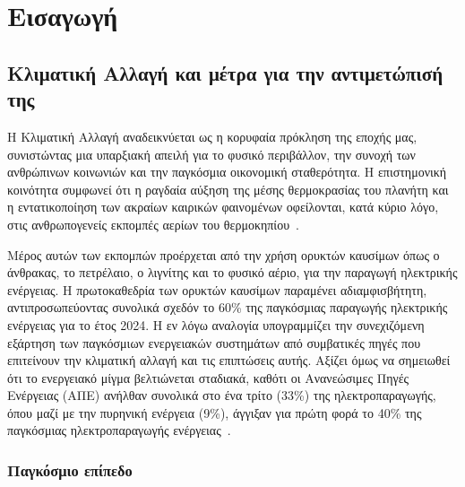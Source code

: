 % 

\chapter{Εισαγωγή}
\label{ch:introduction}

\section{Κλιματική Αλλαγή και μέτρα για την αντιμετώπισή της}
\label{sec:climate-change}

Η Κλιματική Αλλαγή αναδεικνύεται ως η κορυφαία πρόκληση της εποχής μας, συνιστώντας μια υπαρξιακή απειλή για το φυσικό περιβάλλον, την συνοχή των ανθρώπινων κοινωνιών και την παγκόσμια οικονομική σταθερότητα. Η επιστημονική κοινότητα συμφωνεί ότι η ραγδαία αύξηση της μέσης θερμοκρασίας του πλανήτη και η εντατικοποίηση των ακραίων καιρικών φαινομένων οφείλονται, κατά κύριο λόγο, στις ανθρωπογενείς εκπομπές αερίων του θερμοκηπίου~\cite{lynas2021}.

Μέρος αυτών των εκπομπών προέρχεται από την χρήση ορυκτών καυσίμων όπως ο άνθρακας, το πετρέλαιο, ο λιγνίτης και το φυσικό αέριο, για την παραγωγή ηλεκτρικής ενέργειας. Η πρωτοκαθεδρία των ορυκτών καυσίμων παραμένει αδιαμφισβήτητη, αντιπροσωπεύοντας συνολικά σχεδόν το 60\% της παγκόσμιας παραγωγής ηλεκτρικής ενέργειας για το έτος 2024. Η εν λόγω αναλογία υπογραμμίζει την συνεχιζόμενη εξάρτηση των παγκόσμιων ενεργειακών συστημάτων από συμβατικές πηγές που επιτείνουν την κλιματική αλλαγή και τις επιπτώσεις αυτής. Αξίζει όμως να σημειωθεί ότι το ενεργειακό μίγμα βελτιώνεται σταδιακά, καθότι οι Ανανεώσιμες Πηγές Ενέργειας (ΑΠΕ) ανήλθαν συνολικά στο ένα τρίτο (33\%) της ηλεκτροπαραγωγής, όπου μαζί με την πυρηνική ενέργεια (9\%), άγγιξαν για πρώτη φορά το 40\% της παγκόσμιας ηλεκτροπαραγωγής ενέργειας~\cite{iea2024}.

\subsection{Παγκόσμιο επίπεδο}
\label{subsec:global-level}

